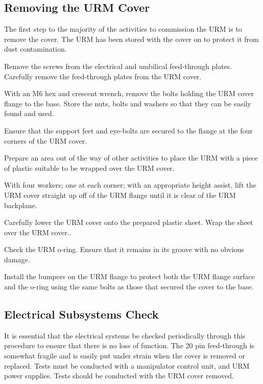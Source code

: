 \documentclass[11pt]{article}
\begin{document}
\subsection{Removing the URM Cover}\label{ss:rmCov}
The first step to the majority of the activities to commission the URM is to remove the cover. The URM has been stored with the cover on to protect it from dust contamination. 
\begin{answerlist}
\item Remove the screws from the electrical and umbilical feed-through plates. Carefully remove the feed-through plates from the URM cover.
\item With an M6 hex and crescent wrench, remove the bolts holding the URM cover flange to the base. Store the nuts, bolts and washers so that they can be easily found and used. 
\item Ensure that the support feet and eye-bolts are secured to the flange at the four corners of the URM cover.
\item Prepare an area out of the way of other activities to place the URM with a piece of plastic suitable to be wrapped over the URM cover.
\item With four workers; one at each corner; with an appropriate height assist, lift the URM cover straight up off of the URM flange until it is clear of the URM backplane.
\item Carefully lower the URM cover onto the prepared plastic sheet. Wrap the sheet over the URM cover.. 
\item Check the URM o-ring. Ensure that it remains in its groove with no obvious damage.
\item Install the bumpers on the URM flange to protect both the URM flange surface and the o-ring using the same bolts as those that secured the cover to the base. 
\end{answerlist}

\subsection{Electrical Subsystems Check}\label{ss:elecSSC}
It is essential that the electrical systems be checked periodically
through this procedure to ensure that there is no loss of
function. The 20 pin feed-through is somewhat fragile and is easily
put under strain when the cover is removed or replaced. Tests must be
conducted with a manipulator control unit, and URM power
supplies. Tests should be conducted with the URM cover removed.
\end{document}
